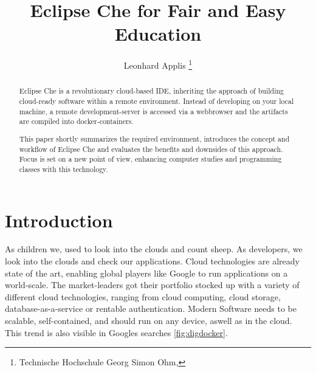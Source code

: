 \documentclass[utf8]{lni}
\begin{document}
\title[Eclipse Che for Education]{Eclipse Che for Fair and Easy Education}
\author[Leonhard Applis]
{Leonhard Applis \footnote{Technische Hochschule Georg Simon Ohm, }}
\maketitle

\begin{abstract}
Eclipse Che is a revolutionary cloud-based IDE, inheriting the approach of building cloud-ready software within a 
remote environment. 
Instead of developing on your local machine, a remote development-server is accessed via a webbrowser 
and the artifacts are compiled into docker-containers. 

This paper shortly summarizes the required environment, introduces the concept and workflow of Eclipse Che and evaluates 
the benefits and downsides of this approach. 
Focus is set on a new point of view, enhancing computer studies and 
programming classes with this technology. 
\end{abstract}


\section{Introduction}
\label{sec:Introduction}
As children we, used to look into the clouds and count sheep. 
As developers, we look into the clouds and check our applications.  
Cloud technologies are already state of the art, enabling global players like Google to run applications on a world-scale.
The market-leaders got their portfolio stocked up with  a  variety  of  different  cloud  technologies,  ranging 
from cloud computing, cloud storage, database-as-a-service or rentable authentication. 
Modern Software needs to be scalable, self-contained, and should run on any device, aswell as in the cloud.  
This trend is also visible in Googles searches \ref{fig:digdocker}. 
\end{document}
